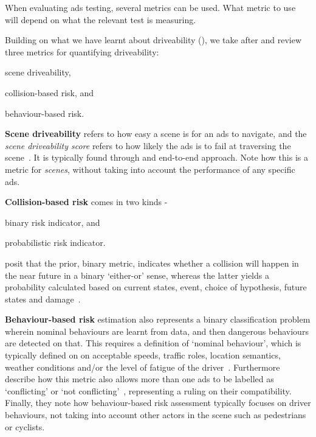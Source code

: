 When evaluating \acrshort{ads} testing, several metrics can be used. What metric to use will depend
on what the relevant test is measuring.

Building on what we have learnt about driveability (),
we take after \citeauthor{safeToDrive} and review three metrics for
quantifying driveability: \begin{inparaenum}
    \item scene driveability,
    \item collision-based risk, and
    \item behaviour-based risk.
\end{inparaenum}

\textbf{Scene driveability} refers to how easy a scene is for an
\acrshort{ads} to navigate, and the \textit{scene driveability score} refers to
how likely the \acrlong{ads} is to fail at traversing the
scene~\cite[3140]{safeToDrive}. It is typically found through and end-to-end
approach. Note how this is a metric for \textit{scenes}, without taking into
account the performance of any specific \acrshort{ads}.

\textbf{Collision-based risk} comes in two kinds - \begin{inparaenum}
    \item binary risk indicator, and
    \item probabilistic risk indicator.
\end{inparaenum} \citeauthor{safeToDrive} posit that the prior, binary metric, indicates whether a
collision will happen in the near future in a binary `either-or' sense, whereas the latter yields a
probability calculated based on current states, event, choice of hypothesis, future states and
damage~\cite[3140]{safeToDrive}.

\textbf{Behaviour-based risk} estimation also represents a binary classification problem wherein
nominal behaviours are learnt from data, and then dangerous behaviours are detected on that. This
requires a definition of `nominal behaviour', which is typically defined on on acceptable speeds,
traffic roles, location semantics, weather conditions and/or the level of fatigue of the
driver~\cite[3140]{safeToDrive}. Furthermore \citeauthor{safeToDrive} describe how this metric also
allows more than one \acrshort{ads} to be labelled as `conflicting' or `not
conflicting'~\cite[3140]{safeToDrive}, representing a ruling on their compatibility. Finally, they
note how behaviour-based risk assessment typically focuses on driver behaviours, not taking into
account other actors in the scene such as pedestrians or cyclists.

